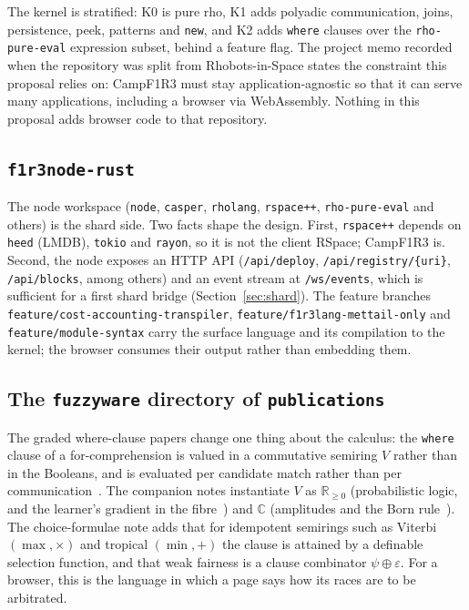 \documentclass[11pt]{article}
\theoremstyle{definition}
\theoremstyle{remark}
\newcommand{\Camp}{CampF1R3}
\newcommand{\code}[1]{\texttt{#1}}
\begin{document}
\noindent
The kernel is stratified: K0 is pure rho, K1 adds polyadic communication, joins,
persistence, peek, patterns and \code{new}, and K2 adds \code{where} clauses over the
\code{rho-pure-eval} expression subset, behind a feature flag. The project memo
recorded when the repository was split from Rhobots-in-Space states the constraint
this proposal relies on: \Camp{} must stay application-agnostic so that it can serve
many applications, including a browser via WebAssembly. Nothing in this proposal
adds browser code to that repository.

\subsection{\code{f1r3node-rust}}

The node workspace (\code{node}, \code{casper}, \code{rholang}, \code{rspace++},
\code{rho-pure-eval} and others) is the shard side. Two facts shape the design.
First, \code{rspace++} depends on \code{heed} (LMDB), \code{tokio} and \code{rayon},
so it is not the client RSpace; \Camp{} is. Second, the node exposes an HTTP API
(\code{/api/deploy}, \code{/api/registry/\{uri\}}, \code{/api/blocks}, among others)
and an event stream at \code{/ws/events}, which is sufficient for a first shard
bridge (Section~\ref{sec:shard}). The feature branches
\code{feature/cost-accounting-transpiler}, \code{feature/f1r3lang-mettail-only} and
\code{feature/module-syntax} carry the surface language and its compilation to the
kernel; the browser consumes their output rather than embedding them.

\subsection{The \code{fuzzyware} directory of \code{publications}}

The graded where-clause papers change one thing about the calculus: the
\code{where} clause of a for-comprehension is valued in a commutative semiring
$V$ rather than in the Booleans, and is evaluated per candidate match rather than
per communication~\cite{gradedwhere}. The companion notes instantiate $V$ as
$\mathbb{R}_{\geq 0}$ (probabilistic logic, and the learner's gradient in the
fibre~\cite{gradedpln}) and $\mathbb{C}$ (amplitudes and the Born
rule~\cite{gradedquantum}). The choice-formulae note adds that for idempotent
semirings such as Viterbi $(\max,\times)$ and tropical $(\min,+)$ the clause is
attained by a definable selection function, and that weak fairness is a clause
combinator $\psi \oplus \varepsilon$. For a browser, this is the language in which a
page says how its races are to be arbitrated.
\end{document}
